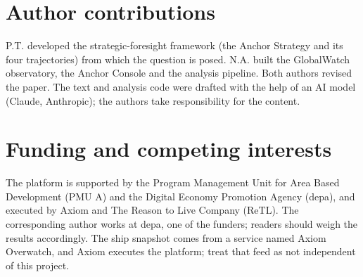 \documentclass[10pt,twocolumn,letterpaper]{article}
\begin{document}
\section*{Author contributions}
P.T. developed the strategic-foresight framework (the Anchor Strategy and its four trajectories) from which the question is posed. N.A. built the GlobalWatch observatory, the Anchor Console and the analysis pipeline. Both authors revised the paper. The text and analysis code were drafted with the help of an AI model (Claude, Anthropic); the authors take responsibility for the content.

\section*{Funding and competing interests}
The platform is supported by the Program Management Unit for Area Based Development (PMU A) and the Digital Economy Promotion Agency (depa), and executed by Axiom and The Reason to Live Company (ReTL). The corresponding author works at depa, one of the funders; readers should weigh the results accordingly. The ship snapshot comes from a service named Axiom Overwatch, and Axiom executes the platform; treat that feed as not independent of this project.



\end{document}

